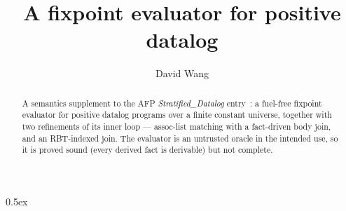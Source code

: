 \documentclass[11pt,a4paper]{article}
\begin{document}
\title{A fixpoint evaluator for positive datalog}
\author{David Wang}
\maketitle

\begin{abstract}
  A semantics supplement to the AFP \emph{Stratified\_Datalog} entry~\cite{datalogIsabelle}: a
  fuel-free fixpoint evaluator for positive datalog programs over a finite constant universe,
  together with two refinements of its inner loop --- assoc-list matching with a fact-driven body
  join, and an RBT-indexed join. The evaluator is an untrusted oracle in the intended use, so it is
  proved sound (every derived fact is derivable) but not complete.
\end{abstract}

\tableofcontents

\parindent 0pt\parskip 0.5ex





\end{document}
